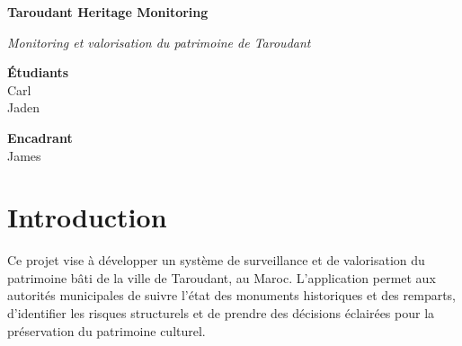 \documentclass[12pt,a4paper]{article}
\begin{document}
\begin{titlepage}
    \vspace*{\fill}
    \begin{center}
        {\Huge\bfseries Taroudant Heritage Monitoring \par}
        \vspace{1.2cm}
        {\Large\itshape Monitoring et valorisation du patrimoine de Taroudant \par}
    \end{center}
    \vspace*{\fill}
    \noindent
    \begin{minipage}[t]{0.45\textwidth}
        \raggedright
        \textbf{Étudiants}\\
        Carl \\
        Jaden
    \end{minipage}
    \hfill
    \begin{minipage}[t]{0.45\textwidth}
        \raggedleft
        \textbf{Encadrant}\\
        James
    \end{minipage}
    \vspace{2cm}
\end{titlepage}
\begin{abstract}
Le suivi du patrimoine bâti de Taroudant repose actuellement sur des procédures manuelles, longues et sujettes à erreurs. Ce projet propose une solution numérique centralisant les données de chaque monument, automatisant la collecte d'informations et fournissant des visualisations en temps réel. L'application permet ainsi de réduire considérablement le temps d'inspection, d'améliorer la traçabilité des interventions et d'offrir aux décideurs une vision claire et actualisée du patrimoine.
\end{abstract}
\clearpage
\tableofcontents
\clearpage
\section{Introduction}

Ce projet vise à développer un système de surveillance et de valorisation du patrimoine bâti de la ville de Taroudant, au Maroc. L'application permet aux autorités municipales de suivre l'état des monuments historiques et des remparts, d'identifier les risques structurels et de prendre des décisions éclairées pour la préservation du patrimoine culturel.
\end{document}
